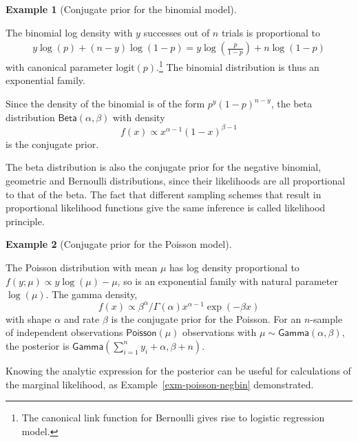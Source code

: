 \documentclass[
  11pt,
  letterpaper,
]{scrbook}
\theoremstyle{definition}
\theoremstyle{plain}
\theoremstyle{plain}
\theoremstyle{definition}
\newtheorem{example}{Example}[chapter]
\theoremstyle{definition}
\theoremstyle{remark}
\begin{document}
\begin{example}[Conjugate prior for the binomial
model]\protect\hypertarget{exm-conjugatepriors-binom}{}\label{exm-conjugatepriors-binom}

The binomial log density with \(y\) successes out of \(n\) trials is
proportional to \begin{align*}
y \log(p) + (n-y) \log(1-p) = y\log\left( \frac{p}{1-p}\right) + n \log(1-p)
\end{align*} with canonical parameter \(\mathrm{logit}(p)\).\footnote{The
  canonical link function for Bernoulli gives rise to logistic
  regression model.} The binomial distribution is thus an exponential
family.

Since the density of the binomial is of the form \(p^y(1-p)^{n-y}\), the
beta distribution \(\mathsf{Beta}(\alpha, \beta)\) with density
\[f(x) \propto x^{\alpha-1} (1-x)^{\beta-1}\] is the conjugate prior.

The beta distribution is also the conjugate prior for the negative
binomial, geometric and Bernoulli distributions, since their likelihoods
are all proportional to that of the beta. The fact that different
sampling schemes that result in proportional likelihood functions give
the same inference is called likelihood principle.

\end{example}

\begin{example}[Conjugate prior for the Poisson
model]\protect\hypertarget{exm-conjugatepriors-poisson}{}\label{exm-conjugatepriors-poisson}

The Poisson distribution with mean \(\mu\) has log density proportional
to \(f(y; \mu) \propto y\log(\mu) -\mu\), so is an exponential family
with natural parameter \(\log(\mu)\). The gamma density,
\[ f(x) \propto \beta^{\alpha}/\Gamma(\alpha)x^{\alpha-1} \exp(-\beta x)\]
with shape \(\alpha\) and rate \(\beta\) is the conjugate prior for the
Poisson. For an \(n\)-sample of independent observations
\(\mathsf{Poisson}(\mu)\) observations with
\(\mu \sim \mathsf{Gamma}(\alpha, \beta)\), the posterior is
\(\mathsf{Gamma}(\sum_{i=1}^n y_i + \alpha, \beta + n)\).

\end{example}

Knowing the analytic expression for the posterior can be useful for
calculations of the marginal likelihood, as
Example~\ref{exm-poisson-negbin} demonstrated.
\end{document}

